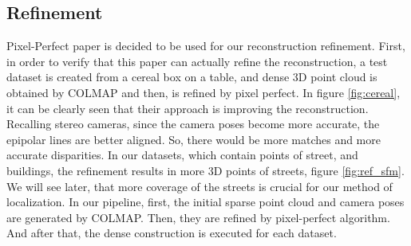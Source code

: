 \documentclass[11pt]{article}
\begin{document}
    \subsection{Refinement}
    Pixel-Perfect paper \cite{lindenberger2021pixsfm} is decided to be used for our reconstruction refinement.
    First, in order to verify that this paper can actually refine the reconstruction, a test dataset is
    created from a cereal box on a table, and dense 3D point cloud is obtained by COLMAP
    and then, is refined by pixel perfect. In figure \ref{fig:cereal}, it can be clearly seen that their approach is improving the reconstruction.
    Recalling stereo cameras, since the camera poses become more accurate, the epipolar lines are better aligned. So, there would be more matches and more accurate disparities.
    In our datasets, which contain points of street, and buildings, the refinement results in more 3D points of streets, figure \ref{fig:ref_sfm}.
    We will see later, that more coverage of the streets is crucial for our method of localization.
    In our pipeline, first, the initial sparse point cloud and camera poses are generated by COLMAP. Then, they are refined
    by pixel-perfect algorithm. And after that, the dense construction is executed for each dataset.
\end{document}
